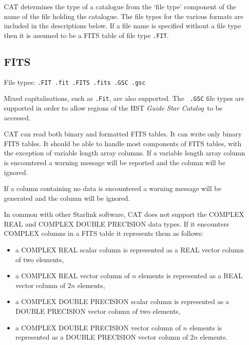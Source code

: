 CAT determines the type of a catalogue from the `file type' component
of the name of the file holding the catalogue. The file types for the
various formats are included in the descriptions below. If a file name
is specified without a file type then it is assumed to be a FITS table
of file type {\tt .FIT}.


\subsection{FITS}

File types: {\tt .FIT  .fit  .FITS  .fits  .GSC  .gsc}

Mixed capitalisations, such as {\tt .Fit}, are also supported.  The {\tt
.GSC} file types are supported in order to allow regions of the HST {\it
Guide Star Catalog}\, to be accessed.

CAT can read both binary and formatted FITS tables. It can write only
binary FITS tables. It should be able to handle most components of
FITS tables, with the exception of variable length array columns. If
a variable length array column is encountered a warning message will
be reported and the column will be ignored.

If a column containing no data is encountered a warning message will be
generated and the column will be ignored.

In common with other Starlink software, CAT does not support the
COMPLEX REAL and COMPLEX DOUBLE PRECISION data types. If it encounters
COMPLEX columns in a FITS table it represents them as follows:

\begin{itemize}

  \item a COMPLEX REAL scalar column is represented as a REAL vector
   column of two elements,

  \item a COMPLEX REAL vector column of $n$ elements is represented as
   a REAL vector column of $2n$ elements,

  \item a COMPLEX DOUBLE PRECISION scalar column is represented as a
   DOUBLE PRECISION vector column of two elements,

  \item a COMPLEX DOUBLE PRECISION vector column of $n$ elements is
   represented as a DOUBLE PRECISION vector column of $2n$ elements.

\end{itemize}

